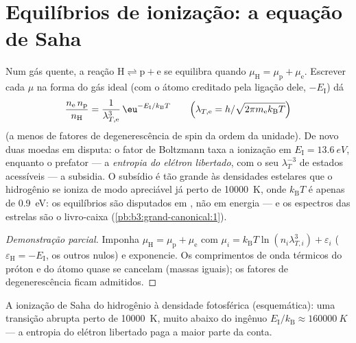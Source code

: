 \section{Equilíbrios de ionização: a equação de Saha}

\begin{proposition}\label{prop:b3:grand-canonical:saha}
Num gás quente, a reação $\text{H} \rightleftharpoons \text{p} +
\text{e}$ se equilibra quando $\mu_{\text{H}} = \mu_{\text{p}} +
\mu_{\text{e}}$. Escrever cada $\mu$ na forma do gás ideal (com o átomo
creditado pela ligação dele, $-E_{\text{I}}$) dá
\[
\frac{n_{\text{e}}\,n_{\text{p}}}{n_{\text{H}}}
 = \frac{1}{\lambda_{T,\text{e}}^3}\,
\eu^{-E_{\text{I}}/k_{\text{B}}T}
\qquad\Big(\lambda_{T,\text{e}} =
h/\sqrt{2\pi m_{\text{e}}k_{\text{B}}T}\Big)
\]
(a menos de fatores de degenerescência de spin da ordem da unidade).
De novo duas moedas em disputa: o fator de Boltzmann taxa a ionização em
$E_{\text{I}} = \qty{13.6}{eV}$, enquanto o prefator --- a
\emph{entropia do elétron libertado}, com o seu $\lambda_T^{-3}$ de
estados acessíveis --- a subsidia. O subsídio é tão grande às densidades
estelares que o hidrogênio se ioniza de modo apreciável já perto de
\qty{10000}{K}, onde $k_{\text{B}}T$ é apenas de
\qty{0.9}{eV}: os equilíbrios são disputados em , não em
energia --- e os espectros das estrelas são o livro-caixa
(\cref{pb:b3:grand-canonical:1}).
\end{proposition}

\begin{proof}[Demonstração parcial]
Imponha $\mu_{\text{H}} = \mu_{\text{p}} + \mu_{\text{e}}$ com $\mu_i
= k_{\text{B}}T\ln(n_i\lambda_{T,i}^3) + \varepsilon_i$
($\varepsilon_{\text{H}} = -E_{\text{I}}$, os outros nulos) e
exponencie. Os comprimentos de onda térmicos do próton e do átomo quase
se cancelam (massas iguais); os fatores de degenerescência ficam admitidos.
\end{proof}

\begin{omfigure}

{\small A ionização de Saha do hidrogênio à densidade fotosférica
(esquemática): uma transição abrupta perto de \qty{10000}{K}, muito
abaixo do ingênuo $E_{\text{I}}/k_{\text{B}} \approx \qty{160000}{K}$
--- a entropia do elétron libertado paga a maior parte da conta.}
\end{omfigure}

